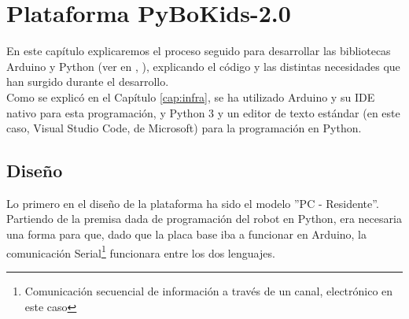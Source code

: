 \chapter{Plataforma PyBoKids-2.0}
\label{cap:PyBoKids}
En este capítulo explicaremos el proceso seguido para desarrollar las bibliotecas Arduino y Python (ver en \cite{arduinolenguaje}, \cite{PythonRef}), explicando el código y las distintas necesidades que han surgido durante el desarrollo. \\
Como se explicó en el Capítulo \ref{cap:infra}, se ha utilizado Arduino  y su IDE nativo para esta programación, y Python 3 y un editor de texto estándar (en este caso, Visual Studio Code, de Microsoft) para la programación en Python. 

\section{Diseño}\label{sec:diseño}
Lo primero en el diseño de la plataforma ha sido el modelo ''PC - Residente''. Partiendo de la premisa dada de programación del robot en Python, era necesaria una forma para que, dado que la placa base iba a funcionar en Arduino, la comunicación Serial\footnote{Comunicación secuencial de información a través de un canal, electrónico en este caso} funcionara entre los dos lenguajes. \\
